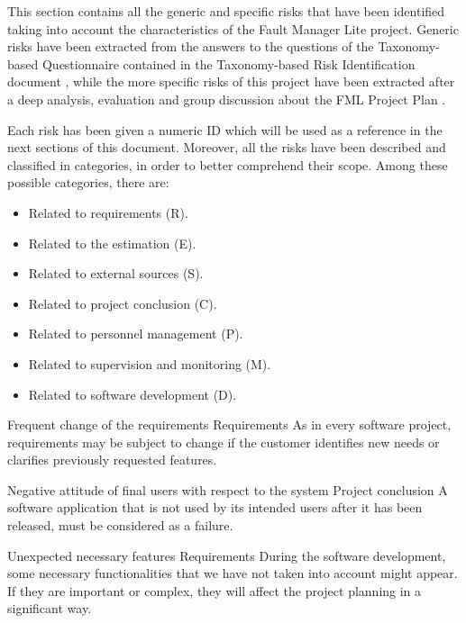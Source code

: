 
This section contains all the generic and specific risks that have been identified taking into account the characteristics of the Fault Manager Lite project. Generic risks have been extracted from the answers to the questions of the Taxonomy-based Questionnaire contained in the Taxonomy-based Risk Identification document \cite{taxonomy93}, while the more specific risks of this project have been extracted after a deep analysis, evaluation and group discussion about the FML Project Plan \cite{plan15}.

Each risk has been given a numeric ID which will be used as a reference in the next sections of this document. Moreover, all the risks have been described and classified in categories, in order to better comprehend their scope.
Among these possible categories, there are:
\begin{itemize}
\item Related to requirements (R).
\item Related to the estimation (E).
\item Related to external sources (S).
\item Related to project conclusion (C).
\item Related to personnel management (P).
\item Related to supervision and monitoring (M).
\item Related to software development (D).
\end{itemize}

\begin{risk}{Frequent change of the requirements}
\label{riskReqChange}
\riskcat Requirements
\riskdesc As in every software project, requirements may be subject to change if the customer identifies new needs or clarifies previously requested features.
\end{risk}

\begin{risk}{Negative attitude of final users with respect to the system}
\label{riskAttitude}
\riskcat Project conclusion
\riskdesc A software application that is not used by its intended users after it has been released, must be considered as a failure.
\end{risk}

\begin{risk}{Unexpected necessary features}
\label{riskFeaturesUnexpected}
\riskcat Requirements
\riskdesc During the software development, some necessary functionalities that we have not taken into account might appear. If they are important or complex, they will affect the project planning in a significant way.
\end{risk}

